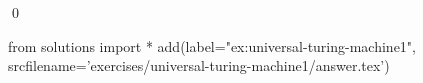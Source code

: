 
\begin{ex} 
  \label{ex:universal-turing-machine1}
  
  \qed
\end{ex} 
\begin{python0}
from solutions import *
add(label="ex:universal-turing-machine1",
    srcfilename='exercises/universal-turing-machine1/answer.tex') 
\end{python0}

